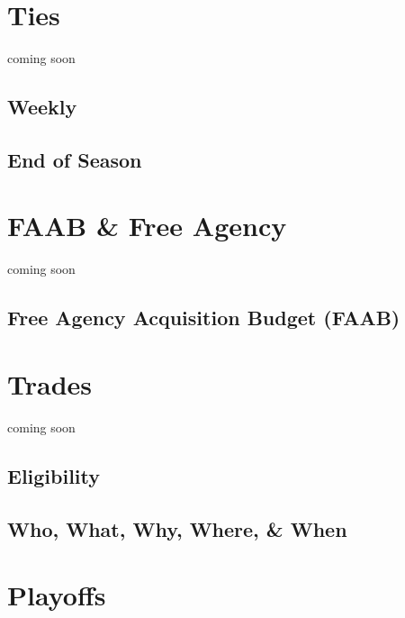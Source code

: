 \documentclass[]{book}
\begin{document}
\hypertarget{ties}{%
\chapter{Ties}\label{ties}}

coming soon

\hypertarget{weekly}{%
\section{Weekly}\label{weekly}}

\hypertarget{end-of-season}{%
\section{End of Season}\label{end-of-season}}

\hypertarget{free-agency}{%
\chapter{FAAB \& Free Agency}\label{free-agency}}

coming soon

\hypertarget{free-agency-acquisition-budget-faab}{%
\section{Free Agency Acquisition Budget (FAAB)}\label{free-agency-acquisition-budget-faab}}

\hypertarget{trades}{%
\chapter{Trades}\label{trades}}

coming soon

\hypertarget{eligibility}{%
\section{Eligibility}\label{eligibility}}

\hypertarget{who-what-why-where-when}{%
\section{Who, What, Why, Where, \& When}\label{who-what-why-where-when}}

\hypertarget{playoffs}{%
\chapter{Playoffs}\label{playoffs}}
\end{document}
